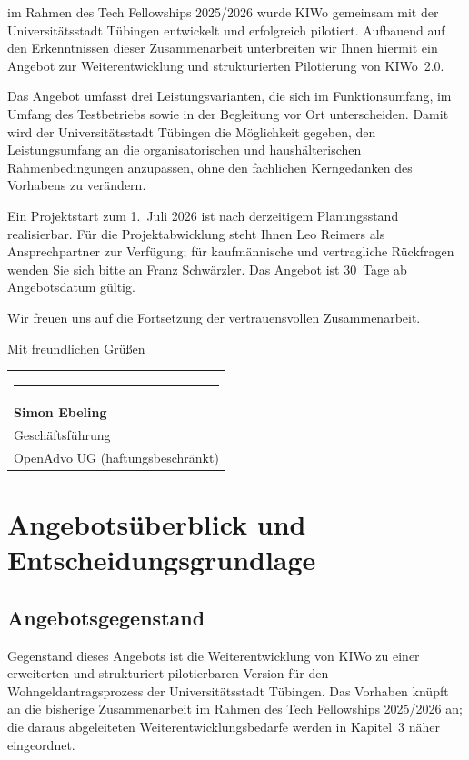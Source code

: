 \documentclass[11pt,a4paper,openany]{report}
\begin{document}
\vspace{0.8em}

im Rahmen des Tech Fellowships 2025/2026 wurde KIWo gemeinsam mit der
Universitätsstadt Tübingen entwickelt und erfolgreich pilotiert.
Aufbauend auf den Erkenntnissen dieser Zusammenarbeit unterbreiten wir
Ihnen hiermit ein Angebot zur Weiterentwicklung und strukturierten
Pilotierung von KIWo~2.0.

Das Angebot umfasst drei Leistungsvarianten, die sich im Funktionsumfang,
im Umfang des Testbetriebs sowie in der Begleitung vor Ort unterscheiden.
Damit wird der Universitätsstadt Tübingen die Möglichkeit gegeben, den
Leistungsumfang an die organisatorischen und haushälterischen
Rahmenbedingungen anzupassen, ohne den fachlichen Kerngedanken des
Vorhabens zu verändern.

Ein Projektstart zum 1.~Juli 2026 ist nach derzeitigem Planungsstand
realisierbar. Für die Projektabwicklung steht Ihnen Leo Reimers als
Ansprechpartner zur Verfügung; für kaufmännische und vertragliche
Rückfragen wenden Sie sich bitte an Franz Schwärzler. Das Angebot ist
30~Tage ab Angebotsdatum gültig.

Wir freuen uns auf die Fortsetzung der vertrauensvollen Zusammenarbeit.

\vspace{1.5em}
\noindent
Mit freundlichen Grüßen

\vspace{2.5em}
\noindent
\begin{tabular}{@{}l@{}}
  \rule{6cm}{0.3pt}\\[0.3em]
  {\sffamily\bfseries Simon Ebeling}\\
  {\small\color{lightgray}Geschäftsführung}\\
  {\small OpenAdvo UG (haftungsbeschränkt)}
\end{tabular}

\chapter{Angebotsüberblick und Entscheidungsgrundlage}

\section{Angebotsgegenstand}

Gegenstand dieses Angebots ist die Weiterentwicklung von KIWo zu einer
erweiterten und strukturiert pilotierbaren Version für den
Wohngeldantragsprozess der Universitätsstadt Tübingen. Das Vorhaben
knüpft an die bisherige Zusammenarbeit im Rahmen des Tech Fellowships
2025/2026 an; die daraus abgeleiteten Weiterentwicklungsbedarfe werden in
Kapitel~3 näher eingeordnet.
\end{document}

